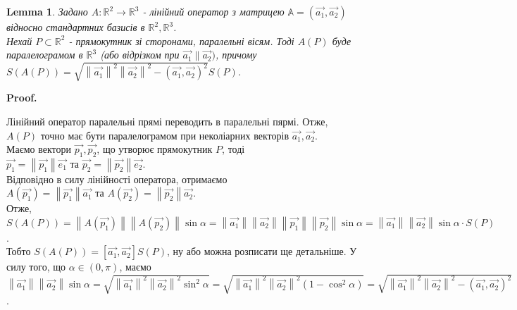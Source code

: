 \documentclass[a4paper, 10pt]{article}
\makeatletter
\def\qed{$\blacksquare$}
\theoremstyle{theoremdd}
\theoremstyle{theoremdd}
\theoremstyle{theoremdd}
\theoremstyle{theoremdd}
\theoremstyle{theoremdd}
\theoremstyle{theoremdd}
\theoremstyle{theoremdd}
\newtheorem{lemma}[theorem]{Lemma}
\theoremstyle{theoremdd}
\renewenvironment{proof}[1][Proof.\\]{\par
\pushQED{\hfill \qed}%
\normalfont \topsep6\p@\@plus6\p@\relax
\trivlist
\item\relax
{\bfseries
#1\@addpunct{.}}\hspace\labelsep\ignorespaces
}{%
\popQED\endtrivlist\@endpefalse
}
\newcommand\Norm[1]{\left\lVert#1\right\rVert}
\makeatother
\begin{document}
\begin{lemma}
Задано $A: \mathbb{R}^2 \to \mathbb{R}^3$ - лінійний оператор з матрицею $\mathbb{A} = ( \vec{a_1}, \vec{a_2} )$ відносно стандартних базисів в $\mathbb{R}^2, \mathbb{R}^3$.\\
Нехай $P \subset \mathbb{R}^2$ - прямокутник зі сторонами, паралельні вісям. Тоді $A(P)$ буде паралелограмом в $\mathbb{R}^3$ (або відрізком при $\vec{a_1} \parallel \vec{a_2})$, причому\\
$S(A(P)) = \sqrt{\Norm{\vec{a_1}}^2 \Norm{\vec{a_2}}^2 - (\vec{a_1},\vec{a_2})^2} S(P)$.
\begin{figure}[H]
\centering
{}
\qquad
{}
\end{figure}
\end{lemma}

\begin{proof}
Лінійний оператор паралельні прямі переводить в паралельні пярмі. Отже, $A(P)$ точно має бути паралелограмом при неколіарних векторів $\vec{a_1},\vec{a_2}$.\\
Маємо вектори $\vec{p_1},\vec{p_2}$, що утворює прямокутник $P$, тоді\\
$\vec{p_1} = \Norm{\vec{p_1}} \vec{e_1}$ та $\vec{p_2} = \Norm{\vec{p_2}} \vec{e_2}$.\\
Відповідно в силу лінійності оператора, отримаємо\\
$A(\vec{p_1}) = \Norm{\vec{p_1}} \vec{a_1}$ та $A(\vec{p_2}) = \Norm{\vec{p_2}} \vec{a_2}$.\\
Отже, $S(A(P)) = \Norm{A(\vec{p_1})} \Norm{A(\vec{p_2})} \sin \alpha = \Norm{\vec{a_1}} \Norm{\vec{a_2}} \Norm{\vec{p_1}} \Norm{\vec{p_2}} \sin \alpha = \Norm{\vec{a_1}} \Norm{\vec{a_2}} \sin \alpha\cdot S(P)$.\\
Тобто $S(A(P)) = [\vec{a_1},\vec{a_2}] S(P)$, ну або можна розписати ще детальніше. У силу того, що $\alpha \in (0,\pi)$, маємо\\
$\Norm{\vec{a_1}} \Norm{\vec{a_2}} \sin \alpha = \sqrt{\Norm{\vec{a_1}}^2 \Norm{\vec{a_2}}^2 \sin^2 \alpha} = \sqrt{\Norm{\vec{a_1}}^2 \Norm{\vec{a_2}}^2 (1-\cos^2 \alpha)} = \sqrt{\Norm{\vec{a_1}}^2 \Norm{\vec{a_2}}^2 - (\vec{a_1},\vec{a_2})^2}$.
\end{proof}
\end{document}
